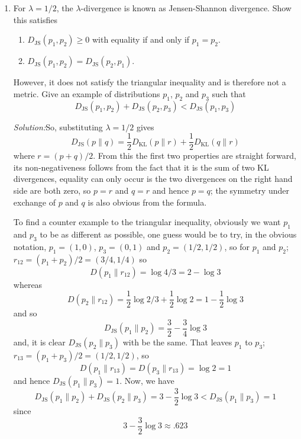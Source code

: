 \documentclass[12pt]{article}
\newcommand{\soln}{\noindent\textit{Solution:}}
\begin{document}
\begin{enumerate}
\item For $\lambda=1/2$, the $\lambda$-divergence is known as Jensen-Shannon divergence. Show this satisfies 
\begin{enumerate}
\item $D_{\mathrm{JS}}(p_1,p_2)\ge 0$ with equality if and only if $p_1=p_2$.
\item $D_{\mathrm{JS}}(p_1,p_2)=D_{\mathrm{JS}}(p_2,p_1)$.
\end{enumerate}
However, it does not satisfy the triangular inequality and is therefore not a metric. Give an example of distributions $p_1$, $p_2$ and $p_3$ such that
\begin{equation}
D_{\mathrm{JS}}(p_1,p_2)+D_{\mathrm{JS}}(p_2,p_3)<D_{\mathrm{JS}}(p_1,p_3)
\end{equation}


\soln So, substituting $\lambda=1/2$ gives
\begin{equation}
D_{\mathrm{JS}}(p\|q) = \frac{1}{2} D_{\mathrm{KL}}(p\|r) + \frac{1}{2} D_{\mathrm{KL}}(q\|r)
\end{equation}
where $r=(p+q)/2$. From this the first two properties are straight forward, its non-negativeness follows from the fact that it is the sum of two KL divergences, equality can only occur is the two divergences on the right hand side are both zero, so $p=r$ and $q=r$ and hence $p=q$; the symmetry under exchange of $p$ and $q$ is also obvious from the formula.

To find a counter example to the triangular inequality, obviously we want $p_1$ and $p_3$ to be as different as possible, one guess would be to try, in the obvious notation, $p_1=(1,0)$, $p_3=(0,1)$ and $p_2=(1/2,1/2)$, so for $p_1$ and $p_2$; $r_{12}=(p_1+p_2)/2=(3/4,1/4)$ so
\begin{equation}
D(p_1\|r_{12})=\log{4/3}=2-\log{3}
\end{equation}
whereas 
\begin{equation}
D(p_2\|r_{12})=\frac{1}{2}\log{2/3}+\frac{1}{2}\log{2}=1-\frac{1}{2}\log{3}
\end{equation}
and so 
\begin{equation}
D_{\mathrm{JS}}(p_1\|p_2)=\frac{3}{2}-\frac{3}{4}\log{3}
\end{equation}
and, it is clear $D_{\mathrm{JS}}(p_2\|p_3)$ with be the same. That leaves $p_1$ to $p_3$; $r_{13}=(p_1+p_3)/2=(1/2,1/2)$, so
\begin{equation}
D(p_1\|r_{13})=D(p_3\|r_{13})=\log{2}=1
\end{equation}
and hence $D_{\mathrm{JS}}(p_1\|p_3)=1$. Now, we have
\begin{equation}
D_{\mathrm{JS}}(p_1\|p_2)+D_{\mathrm{JS}}(p_2\|p_3)=3-\frac{3}{2}\log{3}<D_{\mathrm{JS}}(p_1\|p_3)=1
\end{equation}
since
\begin{equation}
3-\frac{3}{2}\log{3}\approx .623
\end{equation}
\end{enumerate}
\end{document}
